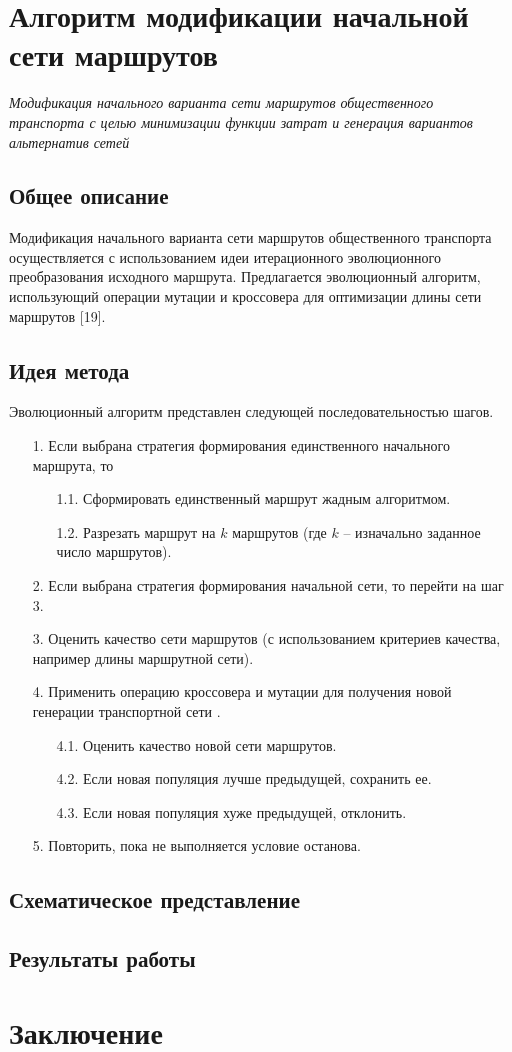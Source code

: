 \clearpage

\section{Алгоритм модификации начальной сети маршрутов}
\label{sec:third-alg}
\emph{Модификация начального варианта сети маршрутов общественного транспорта с целью минимизации функции 
затрат и генерация вариантов альтернатив сетей}
\subsection{Общее описание}
Модификация начального варианта сети маршрутов общественного транспорта осуществляется с использованием идеи 
итерационного эволюционного преобразования исходного маршрута. Предлагается эволюционный алгоритм, 
использующий операции мутации и кроссовера для оптимизации длины сети маршрутов [19].

\subsection{Идея метода}
Эволюционный алгоритм представлен следующей последовательностью шагов. 
\begin{enumerate}
    \item[1.] Если выбрана стратегия формирования единственного начального маршрута, то 
    \begin{enumerate}
        \item[1.1.] Сформировать единственный маршрут жадным алгоритмом.
        \item[1.2.] Разрезать маршрут на \( k \) маршрутов (где \( k \) -- изначально заданное число 
            маршрутов).
    \end{enumerate}
    \item[2.] Если выбрана стратегия формирования начальной сети, то перейти на шаг 3.
    \item[3.] Оценить качество сети маршрутов (с использованием критериев качества, например длины 
        маршрутной сети).
    \item[4.] Применить операцию кроссовера и мутации для получения новой генерации транспортной 
        сети \cite{bib:20}.
    \begin{enumerate}
        \item[4.1.] Оценить качество новой сети маршрутов.
        \item[4.2.] Если новая популяция лучше предыдущей, сохранить ее.
        \item[4.3.] Если новая популяция хуже предыдущей, отклонить. 
    \end{enumerate}
    \item[5.] Повторить, пока не выполняется условие останова.
\end{enumerate}

\subsection{Схематическое представление}
\subsection{Результаты работы}

\section{Заключение}